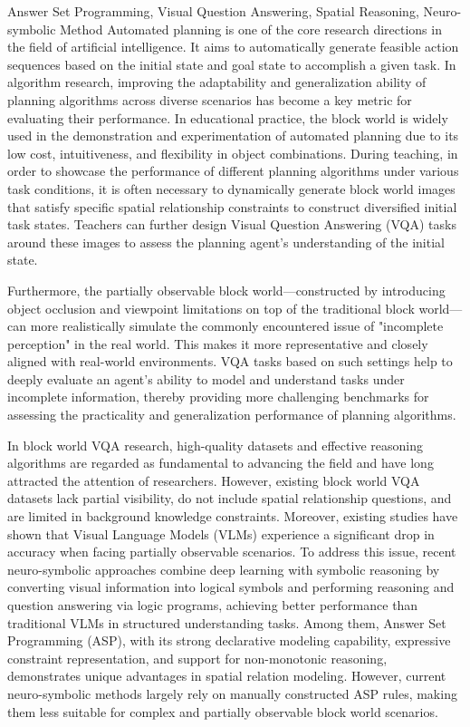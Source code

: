 \begin{englishabstract}{Answer Set Programming, Visual Question Answering, Spatial Reasoning, Neuro-symbolic Method}
Automated planning is one of the core research directions in the field of artificial intelligence. It aims to automatically generate feasible action sequences based on the initial state and goal state to accomplish a given task. In algorithm research, improving the adaptability and generalization ability of planning algorithms across diverse scenarios has become a key metric for evaluating their performance. In educational practice, the block world is widely used in the demonstration and experimentation of automated planning due to its low cost, intuitiveness, and flexibility in object combinations. During teaching, in order to showcase the performance of different planning algorithms under various task conditions, it is often necessary to dynamically generate block world images that satisfy specific spatial relationship constraints to construct diversified initial task states. Teachers can further design Visual Question Answering (VQA) tasks around these images to assess the planning agent's understanding of the initial state.

Furthermore, the partially observable block world—constructed by introducing object occlusion and viewpoint limitations on top of the traditional block world—can more realistically simulate the commonly encountered issue of "incomplete perception" in the real world. This makes it more representative and closely aligned with real-world environments. VQA tasks based on such settings help to deeply evaluate an agent's ability to model and understand tasks under incomplete information, thereby providing more challenging benchmarks for assessing the practicality and generalization performance of planning algorithms.

In block world VQA research, high-quality datasets and effective reasoning algorithms are regarded as fundamental to advancing the field and have long attracted the attention of researchers. However, existing block world VQA datasets lack partial visibility, do not include spatial relationship questions, and are limited in background knowledge constraints. Moreover, existing studies have shown that Visual Language Models (VLMs) experience a significant drop in accuracy when facing partially observable scenarios. To address this issue, recent neuro-symbolic approaches combine deep learning with symbolic reasoning by converting visual information into logical symbols and performing reasoning and question answering via logic programs, achieving better performance than traditional VLMs in structured understanding tasks. Among them, Answer Set Programming (ASP), with its strong declarative modeling capability, expressive constraint representation, and support for non-monotonic reasoning, demonstrates unique advantages in spatial relation modeling. However, current neuro-symbolic methods largely rely on manually constructed ASP rules, making them less suitable for complex and partially observable block world scenarios.


\end{englishabstract}
